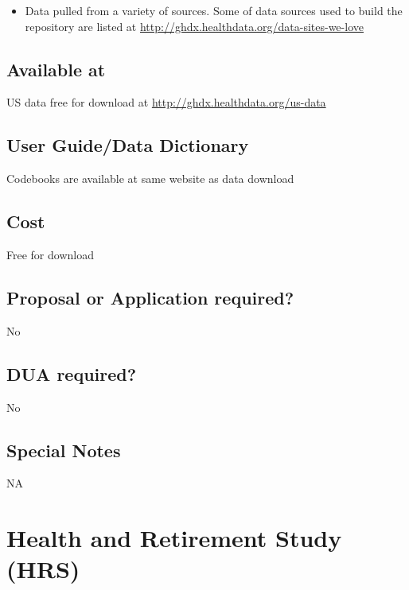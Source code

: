 \documentclass[
]{book}
\providecommand{\tightlist}{%
  \setlength{\itemsep}{0pt}\setlength{\parskip}{0pt}}
\begin{document}
\begin{itemize}
\tightlist
\item
  Data pulled from a variety of sources. Some of data sources used to build the repository are listed at \url{http://ghdx.healthdata.org/data-sites-we-love}
\end{itemize}

\hypertarget{available-at-28}{%
\section{Available at}\label{available-at-28}}

US data free for download at \url{http://ghdx.healthdata.org/us-data}

\hypertarget{user-guidedata-dictionary-28}{%
\section{User Guide/Data Dictionary}\label{user-guidedata-dictionary-28}}

Codebooks are available at same website as data download

\hypertarget{cost-28}{%
\section{Cost}\label{cost-28}}

Free for download

\hypertarget{proposal-or-application-required-28}{%
\section{Proposal or Application required?}\label{proposal-or-application-required-28}}

No

\hypertarget{dua-required-28}{%
\section{DUA required?}\label{dua-required-28}}

No

\hypertarget{special-notes-28}{%
\section{Special Notes}\label{special-notes-28}}

NA

\mainmatter

\hypertarget{health-and-retirement-study-hrs}{%
\chapter{Health and Retirement Study (HRS)}\label{health-and-retirement-study-hrs}}
\end{document}
